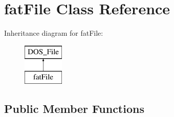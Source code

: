 \hypertarget{classfatFile}{\section{fat\-File Class Reference}
\label{classfatFile}
}
Inheritance diagram for fat\-File\-:\begin{figure}[H]
\begin{center}
\leavevmode
\includegraphics[height=2.000000cm]{classfatFile}
\end{center}
\end{figure}
\subsection*{Public Member Functions}
